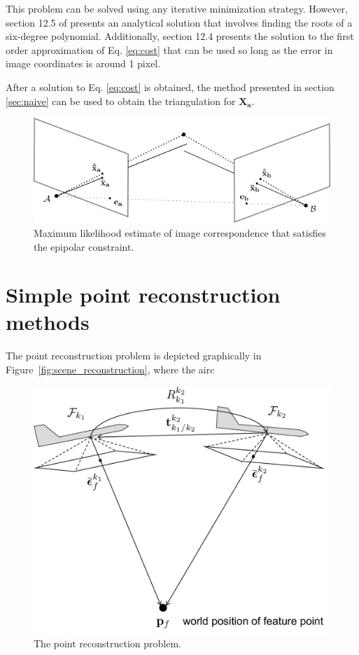 	This problem can be solved using any iterative minimization strategy. However, section 12.5 of \cite{Hartley2004} presents an analytical solution that involves finding the roots of a six-degree polynomial. Additionally, section 12.4 presents the solution to the first order approximation of Eq. \ref{eq:cost} that can be used so long as the error in image coordinates is around 1 pixel.
	
	After a solution to Eq. \ref{eq:cost} is obtained, the method presented in section \ref{sec:naive} can be used to obtain the triangulation for $\mathbf{X_a}$.
	
	\begin{figure}
		\includegraphics[width=\linewidth]{chap8_scene_reconstruction/figures/epipolar_noise_corr}
		\caption{Maximum likelihood estimate of image correspondence that satisfies the epipolar constraint.}
		\label{fig:noise_corr}
	\end{figure}



\section{Simple point reconstruction methods}
\label{sec:point_reconstruction}

The point reconstruction problem is depicted graphically in Figure~\ref{fig:scene_reconstruction}, where the airc

\begin{figure}[h]
	\includegraphics[width=0.8\linewidth]{chap8_scene_reconstruction/figures/point_reconstruction}
	\caption{The point reconstruction problem.}
	\label{fig:point_reconstruction}
\end{figure}


